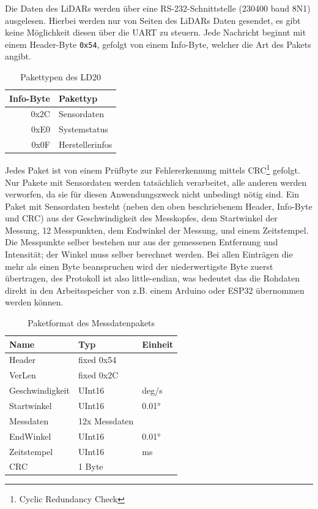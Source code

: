 Die Daten des LiDARs werden über eine RS-232-Schnittstelle (230400 baud 8N1) ausgelesen.
%
Hierbei werden nur von Seiten des LiDARs Daten gesendet,
es gibt keine Möglichkeit diesen über die UART zu steuern.
%
Jede Nachricht beginnt mit einem Header-Byte \texttt{0x54},
gefolgt von einem Info-Byte,
welcher die Art des Pakets angibt.
\begin{table}[H]
    \centering
    \begin{tabular}{r|l}
    Info-Byte & Pakettyp   \\ \hline
    0x2C      & Sensordaten \\
    0xE0      & Systemstatus \\
    0x0F      & Herstellerinfos   
    \end{tabular}
    \caption{Pakettypen des LD20}
    \label{tab:ld20-packet-overview}
\end{table}
Jedes Paket ist von einem Prüfbyte zur Fehlererkennung mittels CRC\footnote{Cyclic Redundancy Check} gefolgt.
%
Nur Pakete mit Sensordaten werden tatsächlich verarbeitet,
alle anderen werden verworfen,
da sie für diesen Anwendungszweck nicht unbedingt nötig sind.
%
Ein Paket mit Sensordaten besteht (neben den oben beschriebenem Header, Info-Byte und CRC)
aus der Geschwindigkeit des Messkopfes,
dem Startwinkel der Messung,
12 Messpunkten,
dem Endwinkel der Messung,
und einem Zeitstempel.
%
Die Messpunkte selber bestehen nur aus der gemessenen Entfernung und Intensität;
der Winkel muss selber berechnet werden.
%
Bei allen Einträgen die mehr als einen Byte beanspruchen wird der niederwertigste Byte zuerst übertragen,
des Protokoll ist also little-endian,
was bedeutet das die Rohdaten direkt in den Arbeitsspeicher von z.B. einem Arduino oder ESP32 übernommen werden können.
\begin{table}[H]
    \centering
    \begin{tabular}{l|l|l}
    Name            & Typ           & Einheit  \\ \hline
    Header          & fixed 0x54    &   \\
    VerLen          & fixed 0x2C    &   \\
    Geschwindigkeit & UInt16        & deg/s \\
    Startwinkel     & UInt16        & 0.01°  \\
    Messdaten       & 12x Messdaten &    \\
    EndWinkel       & UInt16        & 0.01° \\
    Zeitstempel     & UInt16        & ms \\
    CRC             & 1 Byte        &
    \end{tabular}
    \caption{Paketformat des Messdatenpakets}
    \label{tab:ld20-measurement-packet}
\end{table}
